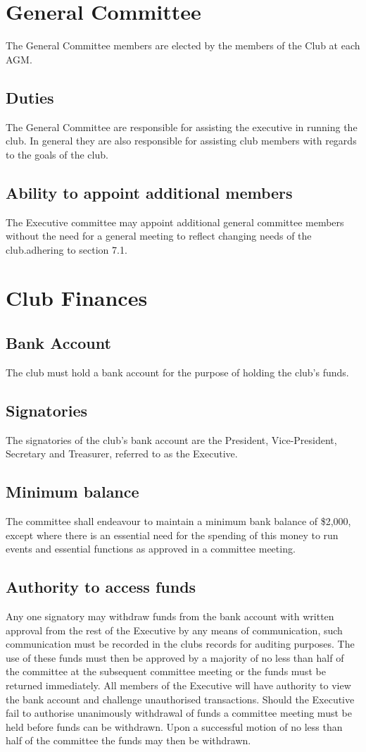 \documentclass[11pt]{article}
\begin{document}
\section{General Committee}
The General Committee members are elected by the members of the Club at each AGM.
\subsection{Duties}
The General Committee are responsible for assisting the executive in running the club. In general they are also responsible for assisting club members with regards to the goals of the club.
\subsection{Ability to appoint additional members}
The Executive committee may appoint additional general committee members without the need for a general meeting to reflect changing needs of the club.adhering to section 7.1.

\section{Club Finances}
\subsection{Bank Account}
The club must hold a bank account for the purpose of holding the club’s funds.
\subsection{Signatories}
The signatories of the club’s bank account are the President, Vice-President, Secretary and Treasurer, referred to as the Executive.
\subsection{Minimum balance}
The committee shall endeavour to maintain a minimum bank balance of \$2,000, except where there is an essential need for the spending of this money to run events and essential functions as approved in a committee meeting.
\subsection{Authority to access funds}
Any one signatory may withdraw funds from the bank account with written approval from the rest of the Executive by any means of communication, such communication must be recorded in the clubs records for auditing purposes. The use of these funds must then be approved by a majority of no less than half of the committee at the subsequent committee meeting or the funds must be returned immediately. All members of the Executive will have authority to view the bank account and challenge unauthorised transactions.
Should the Executive fail to authorise unanimously withdrawal of funds a committee meeting must be held before funds can be withdrawn. Upon a successful motion of no less than half of the committee the funds may then be withdrawn.
\end{document}
